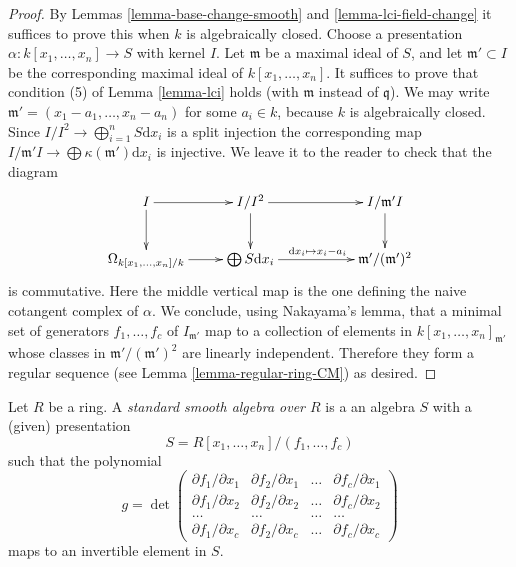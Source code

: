 \begin{proof}
By Lemmas \ref{lemma-base-change-smooth} and
\ref{lemma-lci-field-change} it suffices to prove this when
$k$ is algebraically closed. Choose a presentation
$\alpha : k[x_1, \ldots, x_n] \to S$ with kernel $I$. Let $\mathfrak m$
be a maximal ideal of $S$, and let $\mathfrak m' \subset I$ be the
corresponding maximal ideal of $k[x_1, \ldots, x_n]$.
It suffices to prove that condition (5) of Lemma
\ref{lemma-lci} holds (with $\mathfrak m$ instead of $\mathfrak q$).
We may write $\mathfrak m' = (x_1 - a_1, \ldots, x_n - a_n)$
for some $a_i \in k$, because $k$ is algebraically closed.
Since $I/I^2 \to \bigoplus_{i = 1}^n S \text{d}x_i$
is a split injection the corresponding map
$I/\mathfrak m' I \to \bigoplus \kappa(\mathfrak m') \text{d}x_i$
is injective. We leave it to the reader to check that the diagram
$$
\xymatrix{
I \ar[r] \ar[d] & I/I^2 \ar[rr] \ar[d] & &
I/\mathfrak m'I \ar[d] \\
\Omega_{k[x_1, \ldots, x_n]/k} \ar[r] &
\bigoplus S\text{d}x_i \ar[rr]^{\text{d}x_i \mapsto x_i - a_i} & &
\mathfrak m'/(\mathfrak m')^2
}
$$
is commutative. Here the middle vertical map is the one defining the
naive cotangent complex of $\alpha$.
We conclude, using Nakayama's lemma,
that a minimal set of generators $f_1, \ldots, f_c$
of $I_{\mathfrak m'}$ map to a collection of elements
in $k[x_1, \ldots, x_n]_{\mathfrak m'}$ whose classes in
$\mathfrak m'/(\mathfrak m')^2$ are linearly independent.
Therefore they form a regular sequence (see Lemma \ref{lemma-regular-ring-CM})
as desired.
\end{proof}

\begin{definition}
\label{definition-standard-smooth}
Let $R$ be a ring.
A {\it standard smooth algebra over $R$} is a an algebra
$S$ with a (given) presentation
$$
S = R[x_1, \ldots, x_n]/(f_1, \ldots, f_c)
$$
such that the polynomial
$$
g =
\det
\left(
\begin{matrix}
\partial f_1/\partial x_1 &
\partial f_2/\partial x_1 &
\ldots &
\partial f_c/\partial x_1 \\
\partial f_1/\partial x_2 &
\partial f_2/\partial x_2 &
\ldots &
\partial f_c/\partial x_2 \\
\ldots & \ldots & \ldots & \ldots \\
\partial f_1/\partial x_c &
\partial f_2/\partial x_c &
\ldots &
\partial f_c/\partial x_c
\end{matrix}
\right)
$$
maps to an invertible element in $S$.
\end{definition}


